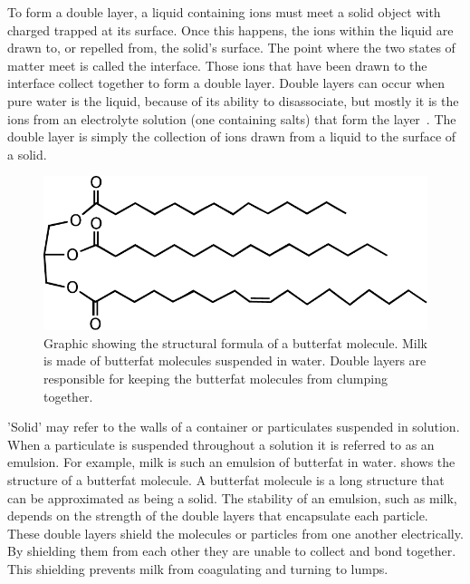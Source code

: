     To form a double layer, a liquid containing ions must meet a solid object with charged trapped at its surface.
    Once this happens, the ions within the liquid are drawn to, or repelled from, the solid's surface.
    The point where the two states of matter meet is called the interface.
    Those ions that have been drawn to the interface collect together to form a double layer.
    Double layers can occur when pure water is the liquid, because of its ability to disassociate, but mostly it is the ions from an electrolyte solution (one containing salts) that form the layer~\cite{Bruesch2004}.
    The double layer is simply the collection of ions drawn from a liquid to the surface of a solid.


    \begin{figure}
        \begin{center}
            \includegraphics[scale=0.8]{content/introduction/graphics/butterfat}
        \end{center}
        \caption{Graphic showing the structural formula of a butterfat molecule. Milk is made of butterfat molecules suspended in water. Double layers are responsible for keeping the butterfat molecules from clumping together.}
        \label{fig:butterfat}
    \end{figure}
    'Solid' may refer to the walls of a container or particulates suspended in solution.
    When a particulate is suspended throughout a solution it is referred to as an emulsion.
    For example, milk is such an emulsion of butterfat in water.
     shows the structure of a butterfat molecule.
    A butterfat molecule is a long structure that can be approximated as being a solid.
    The stability of an emulsion, such as milk, depends on the strength of the double layers that encapsulate each particle.
    These double layers shield the molecules or particles from one another electrically.
    By shielding them from each other they are unable to collect and bond together.
    This shielding prevents milk from coagulating and turning to lumps.

